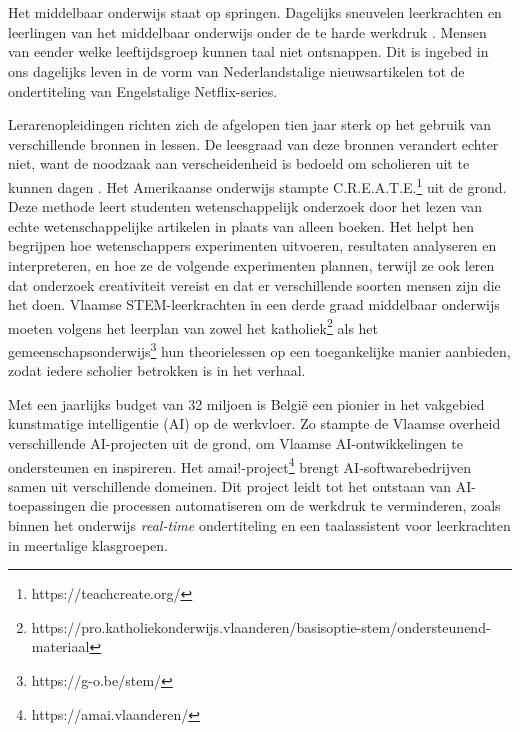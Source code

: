 
\chapter{}%
\label{ch:inleiding}


Het middelbaar onderwijs staat op springen. Dagelijks sneuvelen leerkrachten en leerlingen van het middelbaar onderwijs onder de te harde werkdruk \autocite{Glorieux2018}. Mensen van eender welke leeftijdsgroep kunnen taal niet ontsnappen. Dit is ingebed in ons dagelijks leven in de vorm van Nederlandstalige nieuwsartikelen tot de ondertiteling van Engelstalige Netflix-series.

Lerarenopleidingen richten zich de afgelopen tien jaar sterk op het gebruik van verschillende bronnen in lessen. De leesgraad van deze bronnen verandert echter niet, want de noodzaak aan verscheidenheid is bedoeld om scholieren uit te kunnen dagen \autocite{Surma2019}. Het Amerikaanse onderwijs stampte C.R.E.A.T.E.\footnote{https://teachcreate.org/} uit de grond. Deze methode leert studenten wetenschappelijk onderzoek door het lezen van echte wetenschappelijke artikelen in plaats van alleen boeken. Het helpt hen begrijpen hoe wetenschappers experimenten uitvoeren, resultaten analyseren en interpreteren, en hoe ze de volgende experimenten plannen, terwijl ze ook leren dat onderzoek creativiteit vereist en dat er verschillende soorten mensen zijn die het doen. Vlaamse STEM-leerkrachten in een derde graad middelbaar onderwijs moeten volgens het leerplan van zowel het katholiek\footnote{https://pro.katholiekonderwijs.vlaanderen/basisoptie-stem/ondersteunend-materiaal} als het gemeenschapsonderwijs\footnote{https://g-o.be/stem/} hun theorielessen op een toegankelijke manier aanbieden, zodat iedere scholier betrokken is in het verhaal.

Met een jaarlijks budget van 32 miljoen is België een pionier \autocite{Crevits2022} in het vakgebied kunstmatige intelligentie (AI) op de werkvloer.  Zo stampte de Vlaamse overheid verschillende AI-projecten uit de grond, om Vlaamse AI-ontwikkelingen te ondersteunen en inspireren. Het amai!-project\footnote{https://amai.vlaanderen/}  brengt AI-softwarebedrijven samen uit verschillende domeinen. Dit project leidt tot het ontstaan van AI-toepassingen die processen automatiseren om de werkdruk te verminderen, zoals binnen het onderwijs \textit{real-time} ondertiteling en een taalassistent voor leerkrachten in meertalige klasgroepen.

